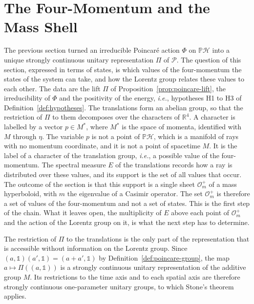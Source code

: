 \section{The Four-Momentum and the Mass Shell}
\label{sec:poincare-spectral}

The previous section turned an irreducible Poincar\'e action $\Phi$ on $\mathbb{P}\mathcal{H}$ into a unique strongly continuous unitary representation $\Pi$ of $\mathcal{P}$. The question of this section, expressed in terms of states, is which values of the four-momentum the states of the system can take, and how the Lorentz group relates these values to each other. The data are the lift $\Pi$ of Proposition~\ref{prop:poincare-lift}, the irreducibility of $\Phi$ and the positivity of the energy, \textit{i.e.}, hypotheses H1 to H3 of Definition~\ref{def:hypotheses}. The translations form an abelian group, so that the restriction of $\Pi$ to them decomposes over the characters of $\mathbb{R}^4$. A character is labelled by a vector $p\in M^*$, where $M^*$ is the space of momenta, identified with $M$ through $\eta$. The variable $p$ is not a point of $\mathbb{P}\mathcal{H}$, which is a manifold of rays with no momentum coordinate, and it is not a point of spacetime $M$. It is the label of a character of the translation group, \textit{i.e.}, a possible value of the four-momentum. The spectral measure $E$ of the translations records how a ray is distributed over these values, and its support is the set of all values that occur. The outcome of the section is that this support is a single sheet $\mathcal{O}_m^+$ of a mass hyperboloid, with $m$ the eigenvalue of a Casimir operator. The set $\mathcal{O}_m^+$ is therefore a set of values of the four-momentum and not a set of states. This is the first step of the chain. What it leaves open, the multiplicity of $E$ above each point of $\mathcal{O}_m^+$ and the action of the Lorentz group on it, is what the next step has to determine.

The restriction of $\Pi$ to the translations is the only part of the representation that is accessible without information on the Lorentz group. Since $(a,\mathbb{1})(a',\mathbb{1})=(a+a',\mathbb{1})$ by Definition~\ref{def:poincare-group}, the map $a\mapsto\Pi((a,\mathbb{1}))$ is a strongly continuous unitary representation of the additive group $M$. Its restrictions to the time axis and to each spatial axis are therefore strongly continuous one-parameter unitary groups, to which Stone's theorem applies.

